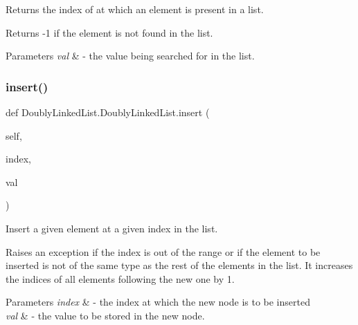 Returns the index of at which an element is present in a list. 

Returns -\/1 if the element is not found in the list.


\begin{DoxyParams}{Parameters}
{\em val} & -\/ the value being searched for in the list. \\
\hline
\end{DoxyParams}
\mbox{\label{class_doubly_linked_list_1_1_doubly_linked_list_a1e220fa0004fef36652923d85765458e}} 
\subsubsection{\texorpdfstring{insert()}{insert()}}
{\footnotesize\ttfamily def Doubly\+Linked\+List.\+Doubly\+Linked\+List.\+insert (\begin{DoxyParamCaption}\item[{}]{self,  }\item[{}]{index,  }\item[{}]{val }\end{DoxyParamCaption})}



Insert a given element at a given index in the list. 

Raises an exception if the index is out of the range or if the element to be inserted is not of the same type as the rest of the elements in the list. It increases the indices of all elements following the new one by 1.


\begin{DoxyParams}{Parameters}
{\em index} & -\/ the index at which the new node is to be inserted \\
\hline
{\em val} & -\/ the value to be stored in the new node. \\
\hline
\end{DoxyParams}
\mbox{\label{class_doubly_linked_list_1_1_doubly_linked_list_a17d87d0a24cb43d435c27cff8b147787}} 
